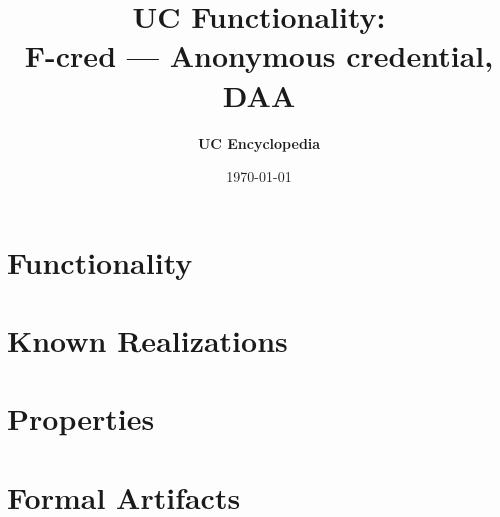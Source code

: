\documentclass[11pt,a4paper]{article}
\title{\textbf{\Large UC Functionality:}\\[0.2em] \Large F-cred --- Anonymous credential, DAA}
\author{\textbf{UC Encyclopedia}}
\date{\today}
\newtheorem{functionality}{Functionality}
\begin{document}
\maketitle

\begin{abstract}
\end{abstract}

\section{Functionality}

%

\section{Known Realizations}


\section{Properties}


\section{Formal Artifacts}

\end{document}
